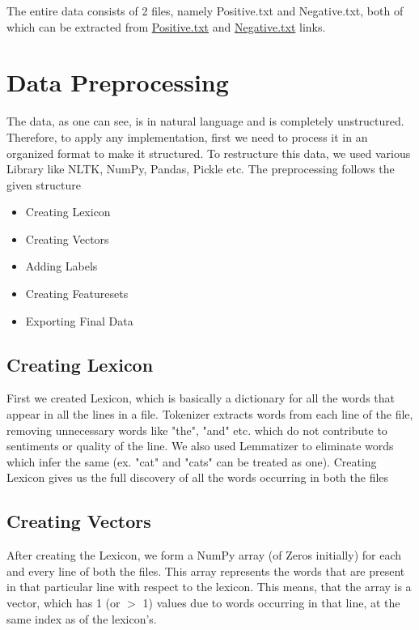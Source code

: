 The entire data consists of 2 files, namely Positive.txt and Negative.txt, both of which can be extracted from \href{https://pythonprogramming.net/static/downloads/machine-learning-data/pos.txt}{Positive.txt} and \href{https://pythonprogramming.net/static/downloads/machine-learning-data/neg.txt}{Negative.txt} links.

\section{Data Preprocessing}
The data, as one can see, is in natural language and is completely unstructured. Therefore, to apply any implementation, first we need to process it in an organized format to make it structured.
To restructure this data, we used various Library like NLTK, NumPy, Pandas, Pickle etc. The preprocessing follows the given structure
\begin{itemize}
  \item Creating Lexicon
  \item Creating Vectors
  \item Adding Labels
  \item Creating Featuresets
  \item Exporting Final Data
\end{itemize}

\subsection{Creating Lexicon}
First we created Lexicon, which is basically a dictionary for all the words that appear in all the lines in a file. Tokenizer extracts words from each line of the file, removing unnecessary words like "the", "and" etc. which do not contribute to sentiments or quality of the line. We also used Lemmatizer to eliminate words which infer the same (ex. "cat" and "cats" can be treated as one). Creating Lexicon gives us the full discovery of all the words occurring in both the files

\subsection{Creating Vectors}
After creating the Lexicon, we form a NumPy array (of Zeros initially) for each and every line of both the files. This array represents the words that are present in that particular line with respect to the lexicon. This means, that the array is a vector, which has 1 (or $>$ 1) values due to words occurring in that line, at the same index as of the lexicon's.

